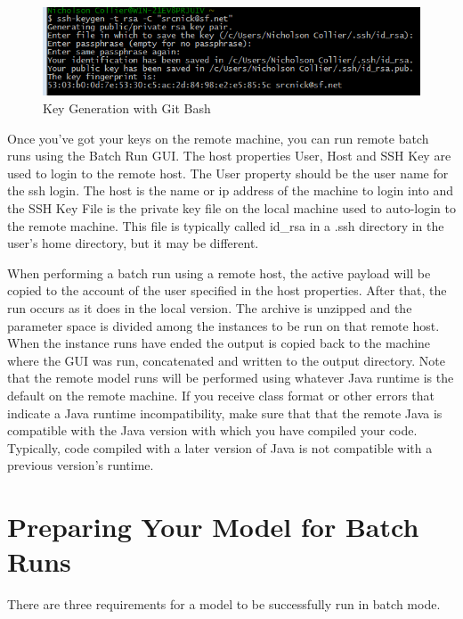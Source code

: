 \documentclass[11pt]{amsart}
\begin{document}
\begin{figure}[h]
\begin{center}
\vspace{.2in}
\centerline {
\includegraphics[width=6in]{images/win_ssh.png}
}
\caption{Key Generation with Git Bash}
\label{fig:win_ssh}
\end{center}
\end{figure}


Once you've got your keys on the remote machine, you can run remote batch runs using the Batch Run GUI. The host properties User, Host and SSH Key are used to login to the remote host. The User property should be the user name for the ssh login. The host is the name or ip address of the machine to login into and the SSH Key File is the private key file on the local machine used to auto-login to the remote machine. This file is typically called id\_rsa in a .ssh directory in the user's home directory,  but it may be different.

When performing a batch run using a remote host, the active payload will be copied to the account of the user specified in the host properties. After that, the run occurs as it does in the local version. The archive is unzipped and the parameter space is divided among the instances to be run on that remote host. When the instance runs have ended the output is copied back to the machine where the GUI was run, concatenated and written to the output directory. Note that the remote model runs will be performed using whatever Java
runtime is the default on the remote machine. If you receive class format or other errors that indicate a Java runtime incompatibility, make sure that that the remote Java is compatible with the Java version with which you have compiled your code. Typically, code
compiled with a later version of Java is not compatible with a previous version's runtime.

\section{Preparing Your Model for Batch Runs}
There are three requirements for a model to be successfully run in batch mode.
\end{document}
